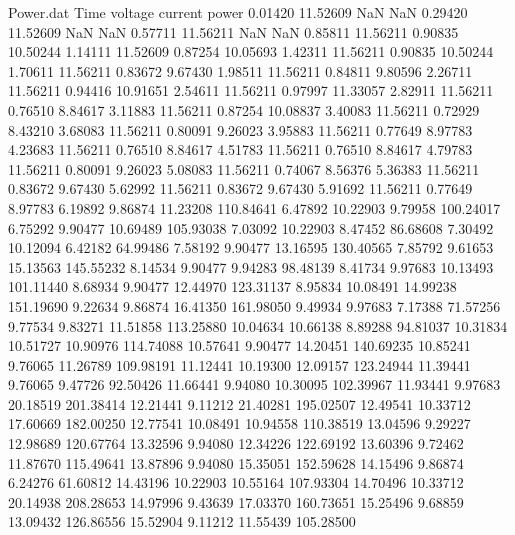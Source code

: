 \begin{filecontents}{Power.dat}
Time voltage current power
   0.01420   11.52609        NaN        NaN
   0.29420   11.52609        NaN        NaN
   0.57711   11.56211        NaN        NaN
   0.85811   11.56211    0.90835   10.50244
   1.14111   11.52609    0.87254   10.05693
   1.42311   11.56211    0.90835   10.50244
   1.70611   11.56211    0.83672    9.67430
   1.98511   11.56211    0.84811    9.80596
   2.26711   11.56211    0.94416   10.91651
   2.54611   11.56211    0.97997   11.33057
   2.82911   11.56211    0.76510    8.84617
   3.11883   11.56211    0.87254   10.08837
   3.40083   11.56211    0.72929    8.43210
   3.68083   11.56211    0.80091    9.26023
   3.95883   11.56211    0.77649    8.97783
   4.23683   11.56211    0.76510    8.84617
   4.51783   11.56211    0.76510    8.84617
   4.79783   11.56211    0.80091    9.26023
   5.08083   11.56211    0.74067    8.56376
   5.36383   11.56211    0.83672    9.67430
   5.62992   11.56211    0.83672    9.67430
   5.91692   11.56211    0.77649    8.97783
   6.19892    9.86874   11.23208  110.84641
   6.47892   10.22903    9.79958  100.24017
   6.75292    9.90477   10.69489  105.93038
   7.03092   10.22903    8.47452   86.68608
   7.30492   10.12094    6.42182   64.99486
   7.58192    9.90477   13.16595  130.40565
   7.85792    9.61653   15.13563  145.55232
   8.14534    9.90477    9.94283   98.48139
   8.41734    9.97683   10.13493  101.11440
   8.68934    9.90477   12.44970  123.31137
   8.95834   10.08491   14.99238  151.19690
   9.22634    9.86874   16.41350  161.98050
   9.49934    9.97683    7.17388   71.57256
   9.77534    9.83271   11.51858  113.25880
  10.04634   10.66138    8.89288   94.81037
  10.31834   10.51727   10.90976  114.74088
  10.57641    9.90477   14.20451  140.69235
  10.85241    9.76065   11.26789  109.98191
  11.12441   10.19300   12.09157  123.24944
  11.39441    9.76065    9.47726   92.50426
  11.66441    9.94080   10.30095  102.39967
  11.93441    9.97683   20.18519  201.38414
  12.21441    9.11212   21.40281  195.02507
  12.49541   10.33712   17.60669  182.00250
  12.77541   10.08491   10.94558  110.38519
  13.04596    9.29227   12.98689  120.67764
  13.32596    9.94080   12.34226  122.69192
  13.60396    9.72462   11.87670  115.49641
  13.87896    9.94080   15.35051  152.59628
  14.15496    9.86874    6.24276   61.60812
  14.43196   10.22903   10.55164  107.93304
  14.70496   10.33712   20.14938  208.28653
  14.97996    9.43639   17.03370  160.73651
  15.25496    9.68859   13.09432  126.86556
  15.52904    9.11212   11.55439  105.28500

\end{filecontents}
